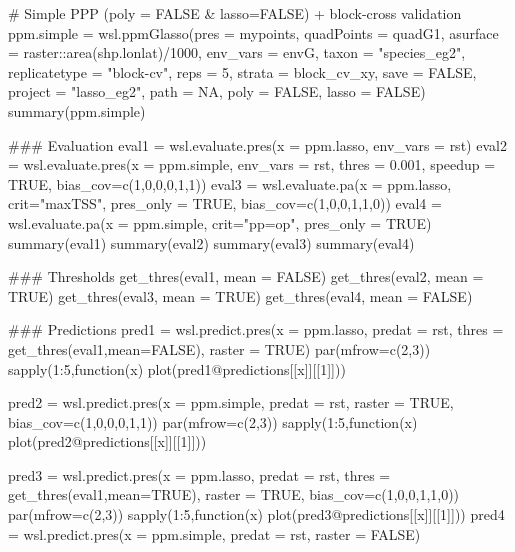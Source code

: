 \documentclass[a4paper]{book}
\begin{document}
\begin{Examples}
\begin{ExampleCode}
  # Simple PPP (poly = FALSE & lasso=FALSE) + block-cross validation
ppm.simple = wsl.ppmGlasso(pres = mypoints,
                       quadPoints = quadG1,
                       asurface = raster::area(shp.lonlat)/1000,
                       env_vars = envG,
                       taxon = "species_eg2",
                       replicatetype = "block-cv",
                       reps = 5,
                       strata = block_cv_xy,
                       save = FALSE,
                       project = "lasso_eg2",
                       path = NA,
                       poly = FALSE,
                       lasso = FALSE)
summary(ppm.simple)

### Evaluation
eval1 = wsl.evaluate.pres(x = ppm.lasso,
                          env_vars = rst)
eval2 = wsl.evaluate.pres(x = ppm.simple,
                          env_vars = rst,
                          thres = 0.001,
                          speedup = TRUE,
                          bias_cov=c(1,0,0,0,1,1))
eval3 = wsl.evaluate.pa(x = ppm.lasso,
                        crit="maxTSS",
                        pres_only = TRUE,
                        bias_cov=c(1,0,0,1,1,0))
eval4 = wsl.evaluate.pa(x = ppm.simple,
                       crit="pp=op",
                       pres_only = TRUE)
summary(eval1)
summary(eval2)
summary(eval3)
summary(eval4)

### Thresholds
get_thres(eval1, mean = FALSE)
get_thres(eval2, mean = TRUE)
get_thres(eval3, mean = TRUE)
get_thres(eval4, mean = FALSE)

### Predictions
pred1 = wsl.predict.pres(x = ppm.lasso,
                         predat = rst,
                         thres = get_thres(eval1,mean=FALSE),
                         raster = TRUE)
par(mfrow=c(2,3))
sapply(1:5,function(x) plot(pred1@predictions[[x]][[1]]))

pred2 = wsl.predict.pres(x = ppm.simple,
                         predat = rst,
                         raster = TRUE,
                         bias_cov=c(1,0,0,0,1,1))
par(mfrow=c(2,3))
sapply(1:5,function(x) plot(pred2@predictions[[x]][[1]]))

pred3 = wsl.predict.pres(x = ppm.lasso,
                         predat = rst,
                         thres = get_thres(eval1,mean=TRUE),
                         raster = TRUE,
                         bias_cov=c(1,0,0,1,1,0))
par(mfrow=c(2,3))
sapply(1:5,function(x) plot(pred3@predictions[[x]][[1]]))
pred4 = wsl.predict.pres(x = ppm.simple,
                         predat = rst,
                         raster = FALSE)

\end{ExampleCode}
\end{Examples}
\end{document}
